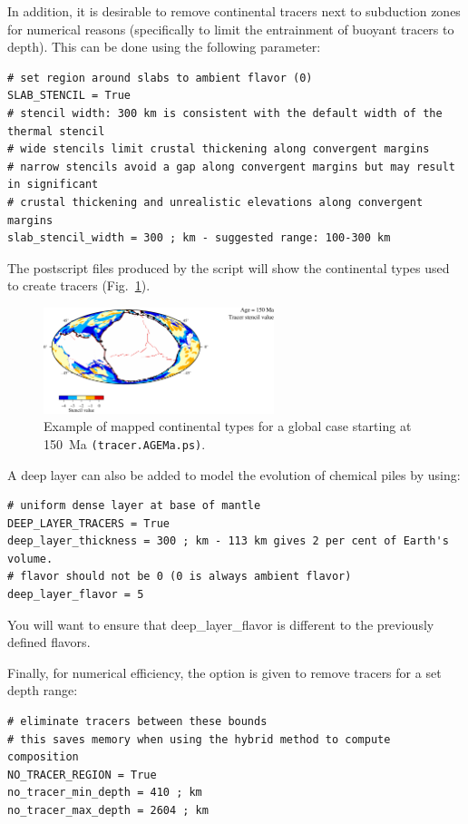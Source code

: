 \documentclass[letterpaper,12pt]{article}
\begin{document}
In addition, it is desirable to remove continental tracers next to subduction zones for numerical reasons (specifically to limit the entrainment of buoyant tracers to depth). This can be done using the following parameter:

\begin{verbatim}
# set region around slabs to ambient flavor (0)
SLAB_STENCIL = True
# stencil width: 300 km is consistent with the default width of the thermal stencil
# wide stencils limit crustal thickening along convergent margins
# narrow stencils avoid a gap along convergent margins but may result in significant
# crustal thickening and unrealistic elevations along convergent margins
slab_stencil_width = 300 ; km - suggested range: 100-300 km
\end{verbatim}

The postscript files produced by the script will show the continental types used to create tracers (Fig.~\ref{fig:cont2ps}).

\begin{figure}[htb]
\centering
\includegraphics[width=0.6\textwidth]{figs/tracer_150Ma}
\caption{Example of mapped continental types for a global case starting at 150~Ma \texttt{(tracer.AGEMa.ps)}. }
\label{fig:cont2ps}
\end{figure}

A deep layer can also be added to model the evolution of chemical piles by using:

\begin{verbatim}
# uniform dense layer at base of mantle
DEEP_LAYER_TRACERS = True
deep_layer_thickness = 300 ; km - 113 km gives 2 per cent of Earth's volume.
# flavor should not be 0 (0 is always ambient flavor)
deep_layer_flavor = 5
\end{verbatim}

You will want to ensure that deep\_layer\_flavor is different to the previously defined flavors.

Finally, for numerical efficiency, the option is given to remove tracers for a set depth range:

\begin{verbatim}
# eliminate tracers between these bounds
# this saves memory when using the hybrid method to compute composition
NO_TRACER_REGION = True
no_tracer_min_depth = 410 ; km
no_tracer_max_depth = 2604 ; km
\end{verbatim}
\end{document}
